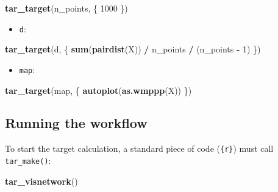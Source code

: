 \documentclass[
  12pt,
  american,
  a4paper,
  extrafontsizes,onecolumn,openright
  ]{memoir}
\newenvironment{Shaded}{\begin{snugshade}}{\end{snugshade}}
\newcommand{\DecValTok}[1]{\textcolor[rgb]{0.00,0.00,0.81}{#1}}
\newcommand{\FunctionTok}[1]{\textcolor[rgb]{0.13,0.29,0.53}{\textbf{#1}}}
\newcommand{\NormalTok}[1]{#1}
\newcommand{\SpecialCharTok}[1]{\textcolor[rgb]{0.81,0.36,0.00}{\textbf{#1}}}
\providecommand{\tightlist}{%
  \setlength{\itemsep}{0pt}\setlength{\parskip}{0pt}}
\begin{document}
\scriptsize

\begin{Shaded}
\begin{Highlighting}[]
\FunctionTok{tar\_target}\NormalTok{(n\_points, \{}
    \DecValTok{1000}
\NormalTok{\})}
\end{Highlighting}
\end{Shaded}

\normalsize

\begin{itemize}
\tightlist
\item
  \texttt{d}:
\end{itemize}

\scriptsize

\begin{Shaded}
\begin{Highlighting}[]
\FunctionTok{tar\_target}\NormalTok{(d, \{}
    \FunctionTok{sum}\NormalTok{(}\FunctionTok{pairdist}\NormalTok{(X)) }\SpecialCharTok{/}\NormalTok{ n\_points }\SpecialCharTok{/}\NormalTok{ (n\_points }\SpecialCharTok{{-}} \DecValTok{1}\NormalTok{)}
\NormalTok{\})}
\end{Highlighting}
\end{Shaded}

\normalsize

\begin{itemize}
\tightlist
\item
  \texttt{map}:
\end{itemize}

\scriptsize

\begin{Shaded}
\begin{Highlighting}[]
\FunctionTok{tar\_target}\NormalTok{(map, \{}
    \FunctionTok{autoplot}\NormalTok{(}\FunctionTok{as.wmppp}\NormalTok{(X))}
\NormalTok{\})}
\end{Highlighting}
\end{Shaded}

\normalsize

\subsection{Running the workflow}\label{running-the-workflow}

To start the target calculation, a standard piece of code (\texttt{\{r\}}) must call \texttt{tar\_make()}:

\scriptsize

\begin{Shaded}
\begin{Highlighting}[]
\FunctionTok{tar\_visnetwork}\NormalTok{()}
\end{Highlighting}
\end{Shaded}
\end{document}
